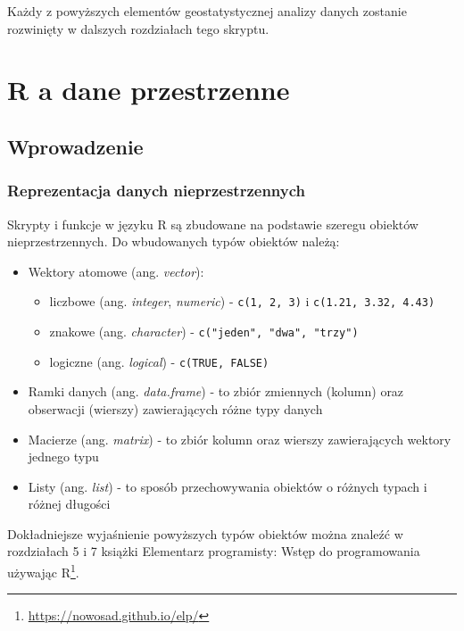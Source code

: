 \documentclass[
  paper=6in:9in,pagesize=pdftex,headinclude=on,footinclude=on,10pt]{scrbook}
\providecommand{\tightlist}{%
  \setlength{\itemsep}{0pt}\setlength{\parskip}{0pt}}
\renewcommand{\href}[2]{#2 (\url{#1})}
\renewcommand{\href}[2]{#2\footnote{\url{#1}}}
\begin{document}
Każdy z powyższych elementów geostatystycznej analizy danych zostanie rozwinięty w dalszych rozdziałach tego skryptu.

\chapter{R a dane przestrzenne}\label{r-a-dane-przestrzenne}

\section{Wprowadzenie}\label{wprowadzenie-1}

\subsection{Reprezentacja danych nieprzestrzennych}\label{reprezentacja-danych-nieprzestrzennych}

Skrypty i funkcje w języku R są zbudowane na podstawie szeregu obiektów nieprzestrzennych.
Do wbudowanych typów obiektów należą:

\begin{itemize}
\tightlist
\item
  Wektory atomowe (ang. \emph{vector}):

  \begin{itemize}
  \tightlist
  \item
    liczbowe (ang. \emph{integer}, \emph{numeric}) - \texttt{c(1,\ 2,\ 3)} i \texttt{c(1.21,\ 3.32,\ 4.43)}
  \item
    znakowe (ang. \emph{character}) - \texttt{c("jeden",\ "dwa",\ "trzy")}
  \item
    logiczne (ang. \emph{logical}) - \texttt{c(TRUE,\ FALSE)}
  \end{itemize}
\item
  Ramki danych (ang. \emph{data.frame}) - to zbiór zmiennych (kolumn) oraz obserwacji (wierszy) zawierających różne typy danych
\item
  Macierze (ang. \emph{matrix}) - to zbiór kolumn oraz wierszy zawierających wektory jednego typu
\item
  Listy (ang. \emph{list}) - to sposób przechowywania obiektów o różnych typach i różnej długości
\end{itemize}

Dokładniejsze wyjaśnienie powyższych typów obiektów można znaleźć w rozdziałach 5 i 7 książki \href{https://nowosad.github.io/elp/}{Elementarz programisty: Wstęp do programowania używając R}.
\end{document}
